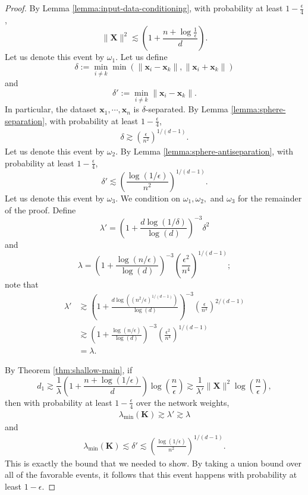 \documentclass{article}
\theoremstyle{definition}
\def\vx{{\bm{x}}}
\def\mK{{\bm{K}}}
\def\mX{{\bm{X}}}
\begin{document}
\begin{proof}
    By Lemma \ref{lemma:input-data-conditioning}, with probability at least $1 - \frac{\epsilon}{4}$,
    \[\|\mX\|^2 \lesssim \left(1 + \frac{n + \log \frac{1}{\epsilon} }{d}\right). \]
    Let us denote this event by $\omega_1$. Let us define
    \[\delta := \min_{i \neq k} \min(\|\vx_i - \vx_k\|, \|\vx_i+ \vx_k\|) \]
    and
    \[\delta' := \min_{i \neq k} \|\vx_i - \vx_k\|. \]
    In particular, the dataset $\vx_1, \cdots, \vx_n$ is $\delta$-separated. By Lemma \ref{lemma:sphere-separation}, with probability at least $1 - \frac{\epsilon}{4}$,
    \begin{align*}
        \delta \gtrsim  \left(\frac{\epsilon}{n^2}\right)^{1/(d - 1)}.
    \end{align*}
    Let us denote this event by $\omega_2$. By Lemma \ref{lemma:sphere-antiseparation}, with probability at least $1 - \frac{\epsilon}{4}$,
    \[\delta' \lesssim  \left(\frac{\log(1/\epsilon) }{n^2} \right)^{1/(d - 1)}. \]
    Let us denote this event by $\omega_3$. We condition on $\omega_1, \omega_2,$ and $\omega_3$ for the remainder of the proof.
    Define
    \[\lambda' = \left(1 + \frac{d\log(1/\delta) }{\log(d)}\right)^{-3} \delta^2 \]
    and
    \[\lambda = \left(1 + \frac{\log(n/\epsilon)}{\log(d)}\right)^{-3}\left(\frac{\epsilon^2}{n^4}\right)^{1/(d - 1)};\]
    note that
    \begin{align*}
        \lambda' &\gtrsim \left(1 + \frac{d \log\left( (n^2/\epsilon)^{1/(d-1)}\right) }{\log(d)} \right)^{-3}\left(\frac{\epsilon}{n^2}\right)^{2/(d - 1)}\\
        &\gtrsim \left(1 + \frac{\log(n/\epsilon)}{\log(d)}\right)^{-3}\left(\frac{\epsilon^2}{n^4}\right)^{1/(d - 1)}\\
        &= \lambda.
    \end{align*}

    By Theorem \ref{thm:shallow-main}, if
    \[d_1 \gtrsim \frac{1}{\lambda}\left(1 + \frac{n + \log(1/\epsilon)}{d}\right) \log\left(\frac{n}{\epsilon}\right) \gtrsim \frac{1}{\lambda'}\|\mX\|^2 \log\left(\frac{n}{\epsilon}\right),  \]
    then with probability at least $1 - \frac{\epsilon}{4}$ over the network weights,
    \begin{align*}
        \lambda_{\min}(\mK) \gtrsim \lambda' \gtrsim \lambda
    \end{align*}
    and
    \begin{align*}
        \lambda_{\min}(\mK) \lesssim \delta' \lesssim \left(\frac{\log(1/\epsilon)}{n^2}\right)^{1/(d - 1)}.
    \end{align*}
    This is exactly the bound that we needed to show. By taking a union bound over all of the favorable events, it follows that this event happens with probability at least $1 - \epsilon$.
\end{proof}
\end{document}

